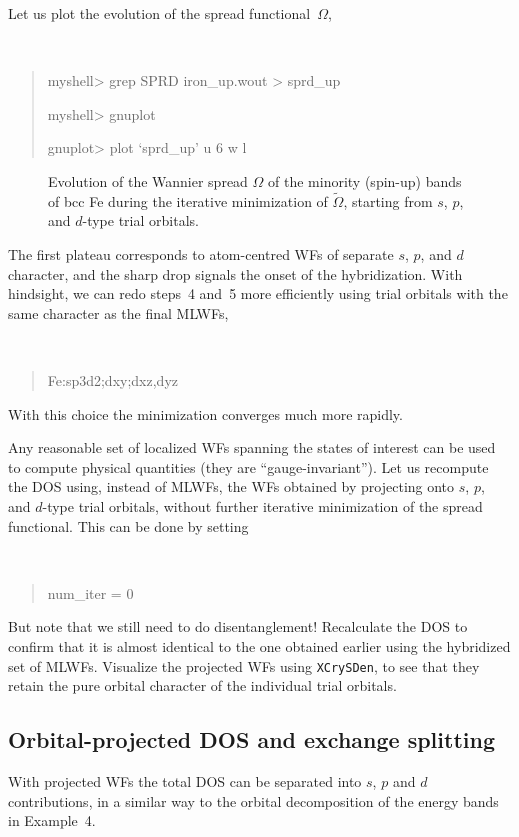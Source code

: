 \documentclass[a4paper,11pt,twoside]{article}
\begin{document}
Let us plot the evolution of the spread functional~$\Omega$,
%
{\tt
\begin{quote}
myshell> grep SPRD iron\_up.wout > sprd\_up

myshell> gnuplot

gnuplot> plot `sprd\_up' u 6  w l
\end{quote}
}

\begin{figure}[h]
\begin{center}
\caption{Evolution of the Wannier spread $\Omega$ of the minority
  (spin-up) bands of bcc Fe during the iterative minimization of
  $\widetilde{\Omega}$, starting from $s$, $p$, and $d$-type trial
  orbitals.}
\label{fig:Fe-sprd}
\end{center}
\end{figure}


The first plateau corresponds to atom-centred WFs of separate $s$,
$p$, and $d$ character, and the sharp drop signals the onset of the
hybridization. With hindsight, we can redo steps~4 and~5 more
efficiently using trial orbitals with the same character as the final
MLWFs,
%
{\tt
\begin{quote}
Fe:sp3d2;dxy;dxz,dyz
\end{quote}
}
%
With this choice the minimization converges much more rapidly.

Any reasonable set of localized WFs spanning the states of interest
can be used to compute physical quantities (they are
``gauge-invariant''). Let us recompute the DOS using, instead of
MLWFs, the WFs obtained by projecting onto $s$, $p$, and $d$-type
trial orbitals, without further iterative minimization of the spread
functional. This can be done by setting
%
{\tt
\begin{quote}
num\_iter = 0
\end{quote}
}
%
But note that we still need to do disentanglement!
Recalculate the DOS to confirm that it is almost identical to the one
obtained earlier using the hybridized set of MLWFs. Visualize the
projected WFs using {\tt XCrySDen}, to see that they retain the pure
orbital character of the individual trial orbitals.


\subsection*{Orbital-projected DOS and exchange splitting}

With projected WFs the total DOS can be separated into $s$, $p$ and
$d$ contributions, in a similar way to the orbital decomposition of
the energy bands in Example~4.
  
\end{document}
